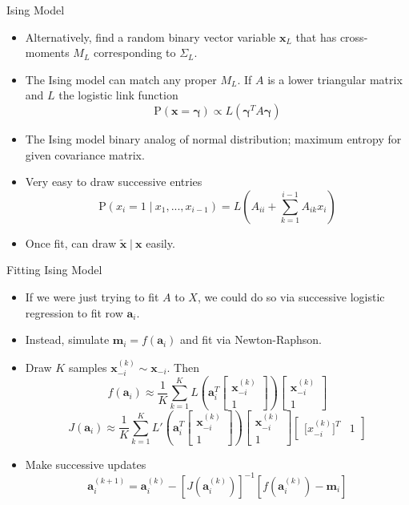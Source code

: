 \documentclass{beamer}
\newcommand{\p}{\mathrm{P}}
\newcommand{\st}{ \; \big | \:}
\begin{document}
\begin{frame}{Ising Model}
    \begin{itemize}
        \item Alternatively, find a random binary vector variable $\mathbf{x}_L$ that has cross-moments $M_L$ corresponding to $\Sigma_L$.
        \item The Ising model can match any proper $M_L$. If $A$ is a lower triangular matrix and $L$ the logistic link function
            \[ \p(\mathbf x=\mathbf \gamma) \propto L(\mathbf{\gamma}^T A\mathbf \gamma)\]
        \item The Ising model binary analog of normal distribution; maximum entropy for given covariance matrix.
        \item Very easy to draw successive entries
            \[ \p(x_{i}=1\st x_{1},...,x_{i-1}) = L\left(A_{ii}+\sum_{k=1}^{i-1}A_{ik}x_i\right) \]
        \item Once fit, can draw $\mathbf{\tilde x}\st \mathbf x$ easily.

    \end{itemize}
\end{frame}

\begin{frame}{Fitting Ising Model}
    \begin{itemize}
        \item If we were just trying to fit $A$ to $X$, we could do so via successive logistic regression to fit row $\mathbf a_i$.
        \item Instead, simulate $\mathbf m_i = f(\mathbf a_i)$ and fit via Newton-Raphson. 
        \item Draw $K$ samples $\mathbf x_{-i}^{(k)}\sim \mathbf x_{-i}$. Then
            \[f\left(\mathbf a_i\right) \approx \frac{1}{K}\sum_{k=1}^K L\left(\mathbf{a}_i^T\left[\begin{array}{c} \mathbf x_{-i}^{(k)} \\ 1 \end{array}\right]\right)\left[\begin{array}{c} \mathbf x_{-i}^{(k)} \\ 1 \end{array}\right] \]
            \[J\left( \mathbf a_i\right) \approx \frac{1}{K}\sum_{k=1}^K L'\left(\mathbf{a}_i^T\left[\begin{array}{c} \mathbf x_{-i}^{(k)} \\ 1 \end{array}\right]\right)\left[\begin{array}{c} \mathbf x_{-i}^{(k)} \\ 1 \end{array}\right]\left[\begin{array}{cc} \mathbf [x_{-i}^{(k)}]^T & 1 \end{array}\right] \]
        \item Make successive updates
            \[\mathbf a_i^{(k+1)} = \mathbf a_i^{(k)} - \left[J\left(\mathbf a_i^{(k)}\right) \right]^{-1}\left[f\left(\mathbf a_i^{(k)}\right)-\mathbf m_i\right] \]
    \end{itemize}
\end{frame}
\end{document}
